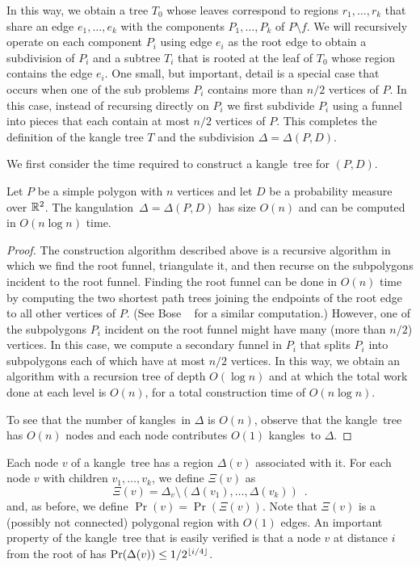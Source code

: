 \documentclass[charterfonts,lotsofwhite]{patmorin}
\newcommand{\kangle}{kangle}
\newcommand{\kangles}{kangles}
\newcommand{\kangulation}{kangulation}
\begin{document}
In this way, we obtain a tree $T_0$ whose leaves correspond to regions
$r_1,\ldots,r_k$ that share an edge $e_1,\ldots,e_k$ with the
components $P_1,\ldots,P_k$ of $P\setminus f$.  We will recursively
operate on each component $P_i$ using edge $e_i$ as the root edge to
obtain a subdivision of $P_i$ and a subtree $T_i$ that is rooted at
the leaf of $T_0$ whose region contains the edge $e_i$.  One small,
but important, detail is a special case that occurs when one of the
sub problems $P_i$ contains more than $n/2$ vertices of $P$.  In this
case, instead of recursing directly on $P_i$ we first subdivide $P_i$
using a funnel into pieces that each contain at most $n/2$ vertices of
$P$.  This completes the definition of the kangle tree $T$ and the
subdivision $\Delta=\Delta(P,D)$. 

We first consider the time required to construct a \kangle\ tree for
$(P,D)$.  

\begin{lem}
Let $P$ be a simple polygon with $n$ vertices and let $D$ be a
probability measure over $\mathbb{R}^2$.  The \kangulation\
$\Delta=\Delta(P,D)$ has size $O(n)$ and can be computed in $O(n\log n)$
time.
\end{lem}

\begin{proof}
The construction algorithm described above is a recursive algorithm in
which we find the root funnel, triangulate it, and then recurse on the
subpolygons incident to the root funnel.  Finding the root funnel can
be done in $O(n)$ time by computing the two shortest path trees
joining the endpoints of the root edge to all other vertices of $P$.
(See Bose \etal\ \cite{geoham} for a similar computation.)  However,
one of the subpolygons $P_i$ incident on the root funnel might have
many (more than $n/2$) vertices.  In this case, we compute a secondary
funnel in $P_i$ that splits $P_i$ into subpolygons each of which have
at most $n/2$ vertices.  In this way, we obtain an algorithm with a
recursion tree of depth $O(\log n)$ and at which the total work done
at each level is $O(n)$, for a total construction time of $O(n\log
n)$.

To see that the number of \kangles\ in $\Delta$ is $O(n)$, observe
that the \kangle\ tree has $O(n)$ nodes and each node contributes
$O(1)$ \kangles\ to $\Delta$.
\end{proof}

Each node $v$ of a \kangle\ tree has a region $\Delta(v)$ associated
with it.  
 For each node $v$ with children $v_1,\ldots,v_k$, we define
$\Xi(v)$ as 
\[
    \Xi(v) = \Delta_v\setminus(\Delta(v_1),\ldots,\Delta(v_k)) \enspace .
\]
and, as before, we define $\Pr(v)=\Pr(\Xi(v))$.  Note that $\Xi(v)$ is
a (possibly not connected) polygonal region with $O(1)$ edges.
An important property of the \kangle\ tree that is easily verified is
that a node $v$ at
distance $i$ from the root of has $\Pr(\Delta(v)) \le 1/2^{\left\lfloor i/4 \right\rfloor}$.
\end{document}
